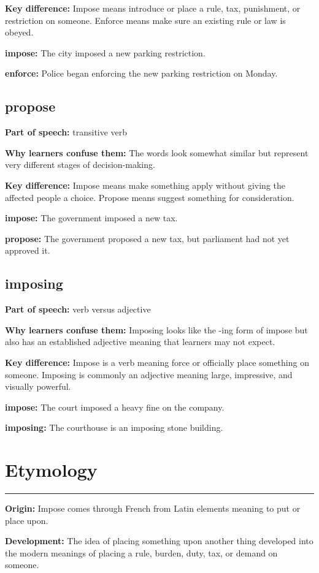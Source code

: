 \documentclass[11pt]{article}
\newcommand{\sectionrule}{\par\vspace{-0.5em}\noindent\textcolor{Accent}{\rule{\linewidth}{0.6pt}}\par}
\begin{document}
\textbf{Key difference:} Impose means introduce or place a rule, tax, punishment, or restriction on someone. Enforce means make sure an existing rule or law is obeyed.

\textbf{impose:} The city imposed a new parking restriction.

\textbf{enforce:} Police began enforcing the new parking restriction on Monday.

\subsection{propose}
\textbf{Part of speech:} transitive verb

\textbf{Why learners confuse them:} The words look somewhat similar but represent very different stages of decision-making.

\textbf{Key difference:} Impose means make something apply without giving the affected people a choice. Propose means suggest something for consideration.

\textbf{impose:} The government imposed a new tax.

\textbf{propose:} The government proposed a new tax, but parliament had not yet approved it.

\subsection{imposing}
\textbf{Part of speech:} verb versus adjective

\textbf{Why learners confuse them:} Imposing looks like the -ing form of impose but also has an established adjective meaning that learners may not expect.

\textbf{Key difference:} Impose is a verb meaning force or officially place something on someone. Imposing is commonly an adjective meaning large, impressive, and visually powerful.

\textbf{impose:} The court imposed a heavy fine on the company.

\textbf{imposing:} The courthouse is an imposing stone building.

\section{Etymology}
\sectionrule
\textbf{Origin:} Impose comes through French from Latin elements meaning to put or place upon.

\textbf{Development:} The idea of placing something upon another thing developed into the modern meanings of placing a rule, burden, duty, tax, or demand on someone.
\end{document}
